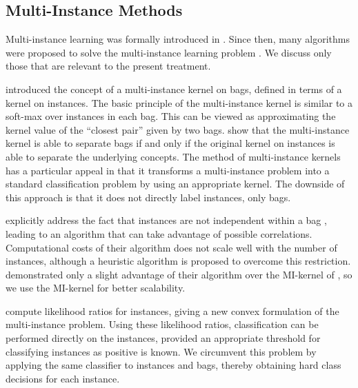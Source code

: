 \subsection{Multi-Instance Methods}
Multi-instance learning was formally introduced in \citet{dietterich1997solving}.
Since then, many algorithms were proposed to solve the multi-instance learning problem
\citep{andrews2003support,gaertner2002multi,zhou2009multi,li2009convex,zhang2002dd,mangasarian2008multiple,leistner2010miforests,chen2006miles}.
We discuss only those that are relevant to the present treatment.

\citet{gaertner2002multi} introduced the concept of a multi-instance
kernel on bags, defined in terms of a kernel on instances. 
The basic principle of the multi-instance kernel is similar to a soft-max over instances in
each bag. This can be viewed as approximating the kernel value of the ``closest pair'' given by two bags. \citet{gaertner2002multi} show that the multi-instance kernel
is able to separate bags if and only if the original kernel on instances is able to separate the underlying concepts.
The method of multi-instance kernels has a particular appeal in that it transforms a multi-instance problem into a standard
classification problem by using an appropriate kernel. The downside of this approach is that it does
not directly label instances, only bags.

\citet{zhou2009multi} explicitly address the fact that instances are not
independent within a bag , leading to an algorithm that can take advantage of
possible correlations. Computational costs of their algorithm does not scale
well with the number of instances, although a heuristic algorithm is proposed
to overcome this restriction. 
\citet{zhou2009multi} demonstrated only a slight
advantage of their algorithm over the MI-kernel of \citet{gaertner2002multi},
so we use the MI-kernel for better scalability.

\citet{liconvex2010} compute likelihood ratios for instances, giving a new
convex formulation of the multi-instance problem. Using these likelihood
ratios, classification can be performed directly on the instances, provided an
appropriate threshold for classifying instances as positive is known. We
circumvent this problem by applying the same classifier to instances and bags,
thereby obtaining hard class decisions for each instance.

